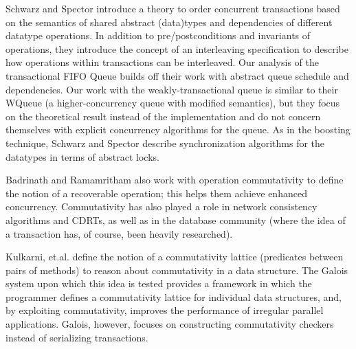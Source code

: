 Schwarz and Spector\cite{schwarz} introduce a theory to order concurrent transactions based on the semantics of shared abstract (data)types and dependencies of different datatype operations. In addition to pre/postconditions and invariants of operations, they introduce the concept of an interleaving specification to describe how operations within transactions can be interleaved. Our analysis of the transactional FIFO Queue builds off their work with abstract queue schedule and dependencies. Our work with the weakly-transactional queue is similar to their WQueue (a higher-concurrency queue with modified semantics), but they focus on the theoretical result instead of the implementation and do not concern themselves with explicit concurrency algorithms for the queue. As in the boosting technique, Schwarz and Spector describe synchronization algorithms for the datatypes in terms of abstract locks.

Badrinath and Ramamritham\cite{badrinath} also work with operation commutativity to define the notion of a recoverable operation; this helps them achieve enhanced concurrency. Commutativity has also played a role in network consistency algorithms and CDRTs\cite{CRDT}, as well as in the database community (where the idea of a transaction has, of course, been heavily researched).

Kulkarni, et.al.\cite{galois} define the notion of a commutativity lattice (predicates between pairs of methods) to reason about commutativity in a data structure. The Galois system upon which this idea is tested provides a framework in which the programmer defines a commutativity lattice for individual data structures, and, by exploiting commutativity, improves the performance of irregular parallel applications. Galois, however, focuses on constructing commutativity checkers instead of serializing transactions.
